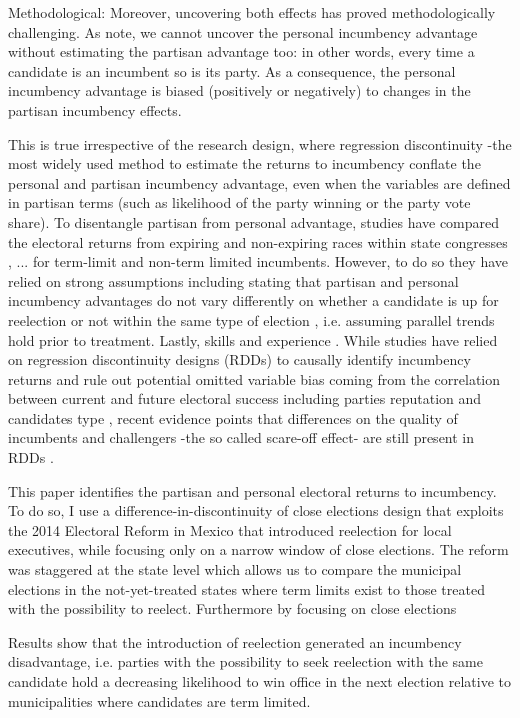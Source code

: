 \documentclass[12pt]{amsart}
\numberwithin{equation}{section}
\theoremstyle{definition}
\theoremstyle{definition}
\theoremstyle{definition}
\begin{document}
Methodological:
Moreover, uncovering both effects has proved methodologically challenging. As \citet{fowler_hall_2014} note, we cannot uncover the personal incumbency advantage without estimating the partisan advantage too: in other words, every time a candidate is an incumbent so is its party. As a consequence, the personal incumbency advantage is biased (positively or negatively) to changes in the partisan incumbency effects. 

 This is true irrespective of the research design, where regression discontinuity -the most widely used method to estimate the returns to incumbency conflate the personal and partisan incumbency advantage, even when the variables are defined in partisan terms (such as likelihood of the party winning or the party vote share). To disentangle partisan from personal advantage, studies have compared the electoral returns from expiring and non-expiring races within state congresses \citep{fowler_hall_2014}, ... for term-limit and non-term limited incumbents. However, to do so they have relied on strong assumptions including stating that partisan and personal incumbency advantages do not vary differently on whether a candidate is up for reelection or not within the same type of election \citep{fowler_hall_2014, ansolabehere_snyder_2004}, i.e. assuming parallel trends hold prior to treatment. Lastly, skills and experience \citep{ferraz_finan_2008, ferraz_finan_2011}. While studies have relied on regression discontinuity designs (RDDs) to causally identify incumbency returns and rule out potential omitted variable bias coming from the correlation between current and future electoral success including parties reputation and candidates type \citep{klasnja_titiunik_2017}, recent evidence points that differences on the quality of incumbents and challengers -the so called scare-off effect- are still present in RDDs \citep{eggers_2017}. 

This paper identifies the partisan and personal electoral returns to incumbency. To do so, I use a difference-in-discontinuity of close elections design that exploits the 2014 Electoral Reform in Mexico that introduced reelection for local executives, while focusing only on a narrow window of close elections. The reform was staggered at the state level which allows us to compare the municipal elections in the not-yet-treated states where term limits exist to those treated with the possibility to reelect. Furthermore by focusing on close elections   

Results show that the introduction of reelection generated an incumbency disadvantage, i.e. parties with the possibility to seek reelection with the same candidate hold a decreasing likelihood to win office in the next election relative to municipalities where candidates are term limited. 
\end{document}
